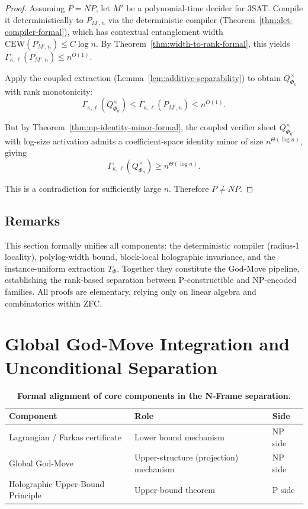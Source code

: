 \documentclass[12pt]{article}
\theoremstyle{definition}
\theoremstyle{definition}
\theoremstyle{remark}
\theoremstyle{remark}
\begin{document}
\begin{proof}
Assuming $P = NP$,
let $M'$ be a polynomial-time decider for 3SAT.
Compile it deterministically to $P_{M',n}$ via the deterministic compiler (Theorem~\ref{thm:det-compiler-formal}),
which has contextual entanglement width $\mathrm{CEW}(P_{M',n}) \le C\log n$.
By Theorem~\ref{thm:width-to-rank-formal}, this yields $\Gamma_{\kappa,\ell}(P_{M',n}) \le n^{O(1)}$.

Apply the coupled extraction (Lemma~\ref{lem:additive-separability}) to obtain $Q^{\times}_{\Phi_n}$ with rank monotonicity:
\[
\Gamma_{\kappa,\ell}(Q^{\times}_{\Phi_n}) \le \Gamma_{\kappa,\ell}(P_{M',n}) \le n^{O(1)}.
\]

But by Theorem~\ref{thm:np-identity-minor-formal}, the coupled verifier sheet $Q^{\times}_{\Phi_n}$ with log-size activation admits a coefficient-space identity minor of size $n^{\Theta(\log n)}$, giving
\[
\Gamma_{\kappa,\ell}(Q^{\times}_{\Phi_n}) \ge n^{\Theta(\log n)}.
\]

This is a contradiction for sufficiently large $n$. Therefore $P \neq NP$.
\end{proof}

\subsection{Remarks}

This section formally unifies all components:
the deterministic compiler (radius-1 locality),
polylog-width bound,
block-local holographic invariance,
and the instance-uniform extraction $T_\Phi$.
Together they constitute the God-Move pipeline,
establishing the rank-based separation between
P-constructible and NP-encoded families.
All proofs are elementary, relying only on linear algebra and combinatorics within ZFC.


\section{Global God-Move Integration and Unconditional Separation}
\label{sec:godmove-final}

\begin{table}[h!]
\centering
\small
\renewcommand{\arraystretch}{1.3}
\setlength{\tabcolsep}{2pt}
\caption[\textbf{Formal alignment of core components in the N-Frame separation.}]%
{\textbf{Formal alignment of core components in the N-Frame separation.}}
\begin{tabular}{|p{3cm}|p{3cm}|p{0.8cm}|}
\hline
\textbf{Component} & \textbf{Role} & \textbf{Side} \\
\hline
Lagrangian / Farkas certificate &
Lower bound mechanism &
NP side \\
\hline
Global God-Move &
Upper-structure (projection) mechanism &
NP side \\
\hline
Holographic Upper-Bound Principle &
Upper-bound theorem &
P side \\
\hline
\end{tabular}
\end{table}
\end{document}
